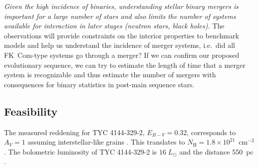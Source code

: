\documentclass[letterpaper,11pt]{article}
\begin{document}
\textit{Given the high incidence of binaries, understanding stellar binary mergers is important for a large number of stars and also limits the number of systems available for interaction in later stages (neutron stars, black holes).} The observations will provide constraints on the interior properties  to benchmark models and help us understand the incidence of merger systems, i.e.\ did all FK~Com-type systems go through a merger? If we can confirm our proposed evolutionary sequence, we can try to estimate the length of time that a merger system is recognizable and thus estimate the number of mergers with consequences for binary statistics in post-main sequence stars.

\subsection*{Feasibility}

\vskip -0.1in
The measured reddening for TYC 4144-329-2, $E_{B-V} = 0.32$, corresponds to $A_V = 1$ assuming interstellar-like grains \cite{2009ApJ...696.1964M}. This translates to $N_\mathrm{H} = 1.8\times10^{21}$~cm$^{-2}$ \cite{1995A&A...293..889P}. The bolometric luminosity of TYC 4144-329-2 is $16\;L_\odot$ and the distance 550~pc \cite{2009ApJ...696.1964M}.
\end{document}
